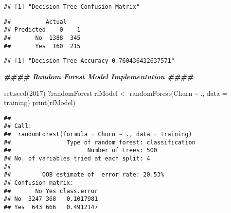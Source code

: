 \documentclass[
]{article}
\newenvironment{Shaded}{\begin{snugshade}}{\end{snugshade}}
\newcommand{\AttributeTok}[1]{\textcolor[rgb]{0.77,0.63,0.00}{#1}}
\newcommand{\CommentTok}[1]{\textcolor[rgb]{0.56,0.35,0.01}{\textit{#1}}}
\newcommand{\DecValTok}[1]{\textcolor[rgb]{0.00,0.00,0.81}{#1}}
\newcommand{\DocumentationTok}[1]{\textcolor[rgb]{0.56,0.35,0.01}{\textbf{\textit{#1}}}}
\newcommand{\FunctionTok}[1]{\textcolor[rgb]{0.00,0.00,0.00}{#1}}
\newcommand{\NormalTok}[1]{#1}
\newcommand{\OtherTok}[1]{\textcolor[rgb]{0.56,0.35,0.01}{#1}}
\newcommand{\SpecialCharTok}[1]{\textcolor[rgb]{0.00,0.00,0.00}{#1}}
\newcommand{\StringTok}[1]{\textcolor[rgb]{0.31,0.60,0.02}{#1}}
\begin{document}
\begin{verbatim}
## [1] "Decision Tree Confusion Matrix"
\end{verbatim}

\begin{verbatim}
##          Actual
## Predicted    0    1
##       No  1388  345
##       Yes  160  215
\end{verbatim}

\begin{Shaded}
\end{Shaded}

\begin{verbatim}
## [1] "Decision Tree Accuracy 0.760436432637571"
\end{verbatim}

\begin{Shaded}
\begin{Highlighting}[]
\DocumentationTok{\#\#\#\# Random Forest Model Implementation \#\#\#\#}

\FunctionTok{set.seed}\NormalTok{(}\DecValTok{2017}\NormalTok{)}
\NormalTok{?randomForest}
\NormalTok{rfModel }\OtherTok{\textless{}{-}} \FunctionTok{randomForest}\NormalTok{(Churn }\SpecialCharTok{\textasciitilde{}}\NormalTok{ ., }\AttributeTok{data =}\NormalTok{ training)}
\FunctionTok{print}\NormalTok{(rfModel)}
\end{Highlighting}
\end{Shaded}

\begin{verbatim}
## 
## Call:
##  randomForest(formula = Churn ~ ., data = training) 
##                Type of random forest: classification
##                      Number of trees: 500
## No. of variables tried at each split: 4
## 
##         OOB estimate of  error rate: 20.53%
## Confusion matrix:
##       No Yes class.error
## No  3247 368   0.1017981
## Yes  643 666   0.4912147
\end{verbatim}
\end{document}
